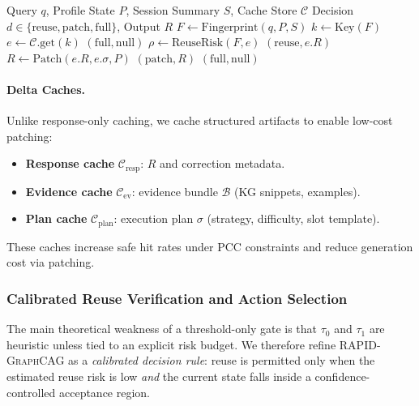 \documentclass[11pt,a4paper,twocolumn]{article}
\newcommand{\rapid}{\textsc{RAPID-GraphCAG}}
\begin{document}
\begin{algorithm}[h]
\caption{\rapid{} Risk-Aware Cache Gate with Delta Patching}
\label{alg:cache_gate}
\footnotesize
\begin{algorithmic}[1]
\REQUIRE Query $q$, Profile State $P$, Session Summary $S$, Cache Store $\mathcal{C}$
\ENSURE Decision $d \in \{\text{reuse},\text{patch},\text{full}\}$, Output $R$
\STATE $F \leftarrow \text{Fingerprint}(q, P, S)$ 
\STATE $k \leftarrow \text{Key}(F)$ 
\STATE $e \leftarrow \mathcal{C}.\text{get}(k)$
  \RETURN $(\text{full}, \text{null})$
\ENDIF
\STATE $\rho \leftarrow \text{ReuseRisk}(F, e)$ 
  \RETURN $(\text{reuse}, e.R)$
  \STATE $R \leftarrow \text{Patch}(e.R, e.\sigma, P)$ 
  \RETURN $(\text{patch}, R)$
\ELSE
  \RETURN $(\text{full}, \text{null})$
\ENDIF
\end{algorithmic}
\end{algorithm}

\paragraph{Delta Caches.} Unlike response-only caching, we cache structured artifacts to enable low-cost patching:
\begin{itemize}[leftmargin=*]
  \item \textbf{Response cache} $\mathcal{C}_{\text{resp}}$: $R$ and correction metadata.
  \item \textbf{Evidence cache} $\mathcal{C}_{\text{ev}}$: evidence bundle $\mathcal{B}$ (KG snippets, examples).
  \item \textbf{Plan cache} $\mathcal{C}_{\text{plan}}$: execution plan $\sigma$ (strategy, difficulty, slot template).
\end{itemize}
These caches increase safe hit rates under PCC constraints and reduce generation cost via patching.

\subsubsection{Calibrated Reuse Verification and Action Selection}

The main theoretical weakness of a threshold-only gate is that $\tau_0$ and $\tau_1$ are heuristic unless tied to an explicit risk budget. We therefore refine \rapid{} as a \emph{calibrated decision rule}: reuse is permitted only when the estimated reuse risk is low \emph{and} the current state falls inside a confidence-controlled acceptance region.
\end{document}
